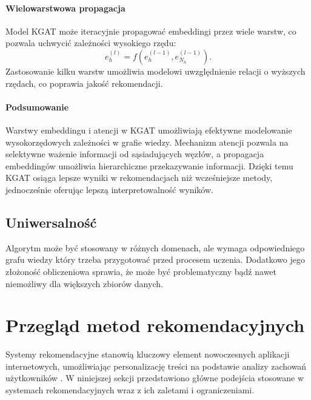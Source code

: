 \documentclass[a4paper,onecolumn]{LTJournalArticle}
\begin{document}
\paragraph{Wielowarstwowa propagacja} Model KGAT może iteracyjnie propagować embeddingi przez wiele warstw, co pozwala uchwycić zależności wysokiego rzędu:
\begin{equation}
    e_h^{(l)} = f(e_h^{(l-1)}, e_{N_h}^{(l-1)}).
\end{equation}
Zastosowanie kilku warstw umożliwia modelowi uwzględnienie relacji o wyższych rzędach, co poprawia jakość rekomendacji.

\paragraph{Podsumowanie} Warstwy embeddingu i atencji w KGAT umożliwiają efektywne modelowanie wysokorzędowych zależności w grafie wiedzy. Mechanizm atencji pozwala na selektywne ważenie informacji od sąsiadujących węzłów, a propagacja embeddingów umożliwia hierarchiczne przekazywanie informacji. Dzięki temu KGAT osiąga lepsze wyniki w rekomendacjach niż wcześniejsze metody, jednocześnie oferując lepszą interpretowalność wyników.

\subsection{Uniwersalność}
Algorytm może być stosowany w różnych domenach, ale wymaga odpowiedniego grafu wiedzy który trzeba przygotować przed procesem uczenia. Dodatkowo jego 
złożoność obliczeniowa sprawia, że może być problematyczny bądź nawet niemożliwy dla większych zbiorów danych.
	
\section{Przegląd metod rekomendacyjnych}

Systemy rekomendacyjne stanowią kluczowy element nowoczesnych aplikacji internetowych, umożliwiając personalizację treści na podstawie analizy zachowań użytkowników \cite{rendle2009bpr}. W niniejszej sekcji przedstawiono główne podejścia stosowane w systemach rekomendacyjnych wraz z ich zaletami i ograniczeniami.
\end{document}
